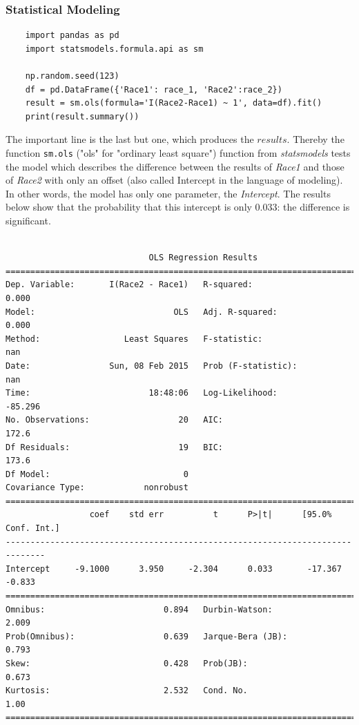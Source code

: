 \subsubsection{Statistical Modeling}

\begin{lstlisting}
    import pandas as pd
    import statsmodels.formula.api as sm

    np.random.seed(123)
    df = pd.DataFrame({'Race1': race_1, 'Race2':race_2})
    result = sm.ols(formula='I(Race2-Race1) ~ 1', data=df).fit()
    print(result.summary())
\end{lstlisting}

The important line is the last but one, which produces the $results$. Thereby the function \lstinline{sm.ols}  ("ols" for "ordinary least square") function from \emph{statsmodels} tests the model which describes the difference between the results of \emph{Race1} and those of \emph{Race2} with only an offset (also called Intercept in the language of modeling). In other words, the model has only one parameter, the \emph{Intercept}. The results below show that the probability that this intercept is only $0.033$: the difference is significant.

 \small\begin{lstlisting}

                             OLS Regression Results
==============================================================================
Dep. Variable:       I(Race2 - Race1)   R-squared:                       0.000
Model:                            OLS   Adj. R-squared:                  0.000
Method:                 Least Squares   F-statistic:                       nan
Date:                Sun, 08 Feb 2015   Prob (F-statistic):                nan
Time:                        18:48:06   Log-Likelihood:                -85.296
No. Observations:                  20   AIC:                             172.6
Df Residuals:                      19   BIC:                             173.6
Df Model:                           0
Covariance Type:            nonrobust
==============================================================================
                 coef    std err          t      P>|t|      [95.0% Conf. Int.]
------------------------------------------------------------------------------
Intercept     -9.1000      3.950     -2.304      0.033       -17.367    -0.833
==============================================================================
Omnibus:                        0.894   Durbin-Watson:                   2.009
Prob(Omnibus):                  0.639   Jarque-Bera (JB):                0.793
Skew:                           0.428   Prob(JB):                        0.673
Kurtosis:                       2.532   Cond. No.                         1.00
==============================================================================
\end{lstlisting}
\normalsize

